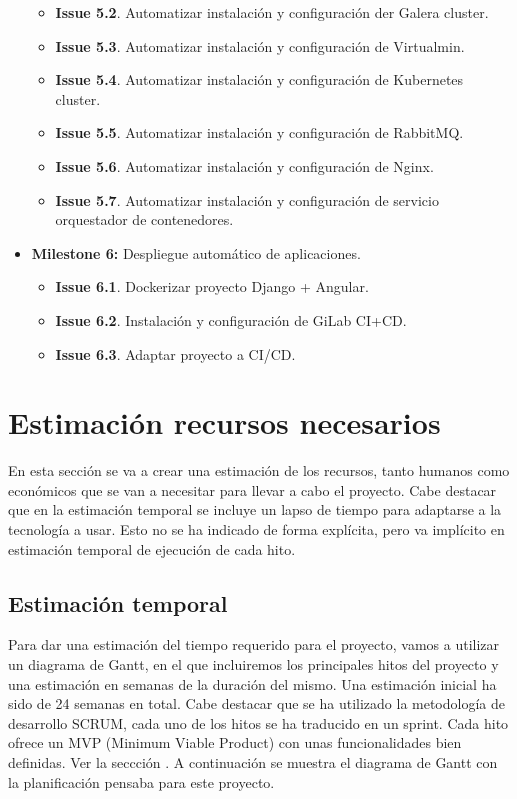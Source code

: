 \begin{text}
\begin{itemize}
\begin{itemize}
			\item \textbf{Issue 5.2}. Automatizar instalación y configuración der Galera cluster.
			\item \textbf{Issue 5.3}. Automatizar instalación y configuración de Virtualmin.
			\item \textbf{Issue 5.4}. Automatizar instalación y configuración de Kubernetes cluster.
			\item \textbf{Issue 5.5}. Automatizar instalación y configuración de RabbitMQ.
			\item \textbf{Issue 5.6}. Automatizar instalación y configuración de Nginx.
			\item \textbf{Issue 5.7}. Automatizar instalación y configuración de servicio orquestador de contenedores.
		\end{itemize}
		\item \textbf{Milestone 6:} Despliegue automático de aplicaciones.
		\begin{itemize}
			\item \textbf{Issue 6.1}. Dockerizar proyecto Django + Angular.
			\item \textbf{Issue 6.2}. Instalación y configuración de GiLab CI+CD.
			\item \textbf{Issue 6.3}. Adaptar proyecto a CI/CD.
		\end{itemize}
	\end{itemize}
\end{text}

\section{Estimación recursos necesarios}
\begin{text}
        En esta sección se va a crear una estimación de los recursos, tanto humanos como económicos que se van a necesitar para llevar a cabo el proyecto. Cabe destacar que en la estimación temporal se incluye un lapso de tiempo para adaptarse a la tecnología a usar. Esto no se ha indicado de forma explícita, pero va implícito en estimación temporal de ejecución de cada hito. \\ 

\end{text}
\subsection{Estimación temporal}
\begin{text}
        Para dar una estimación del tiempo requerido para el proyecto, vamos a utilizar un diagrama de Gantt, en el que incluiremos los principales hitos del proyecto y una estimación en semanas de la duración del mismo. Una estimación inicial ha sido de 24 semanas en total. Cabe destacar que se ha utilizado la metodología de desarrollo SCRUM, cada uno de los hitos se ha traducido en un sprint. Cada hito ofrece un MVP (Minimum Viable Product) con unas funcionalidades bien definidas. Ver la seccción . A continuación se muestra el diagrama de Gantt con la planificación pensaba para este proyecto.
\end{text}

